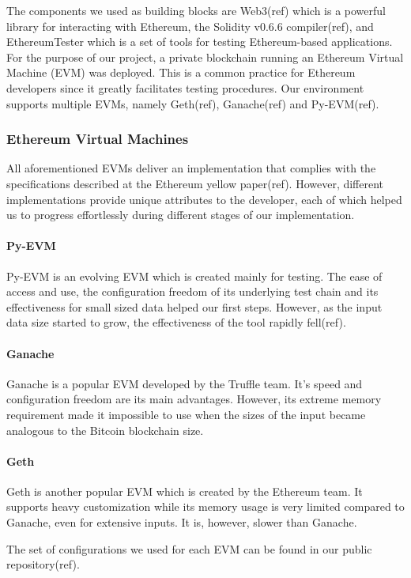\documentclass{article}
\begin{document}
  The components we used as building blocks are Web3(ref) which is a
  powerful library for interacting with Ethereum, the Solidity v0.6.6
  compiler(ref), and EthereumTester which is a set of tools for testing
  Ethereum-based applications. For the purpose of our project, a private
  blockchain running an Ethereum Virtual Machine (EVM) was deployed.
  This is a common practice for Ethereum developers since it greatly
  facilitates testing procedures. Our environment supports multiple
  EVMs, namely Geth(ref), Ganache(ref) and Py-EVM(ref).

  \subsubsection{Ethereum Virtual Machines}

  All aforementioned EVMs deliver an implementation that complies with
  the specifications described at the Ethereum yellow paper(ref).
  However, different implementations provide unique attributes to the
  developer, each of which helped us to progress effortlessly during
  different stages of our implementation. \paragraph {Py-EVM} Py-EVM is
  an evolving EVM which is created mainly for testing. The ease of
  access and use, the configuration freedom of its underlying test chain
  and its effectiveness for small sized data helped our first steps.
  However, as the input data size started to grow, the effectiveness of
  the tool rapidly fell(ref). \paragraph {Ganache} Ganache is a popular
  EVM developed by the Truffle team. It’s speed and configuration
  freedom are its main advantages. However, its extreme memory
  requirement made it impossible to use when the sizes of the input
  became analogous to the Bitcoin blockchain size. \paragraph {Geth}
  Geth is another popular EVM which is created by the Ethereum team. It
  supports heavy customization while its memory usage is very limited
  compared to Ganache, even for extensive inputs. It is, however, slower
  than Ganache.

  The set of configurations we used for each EVM can be found in our
  public repository(ref).
\end{document}
